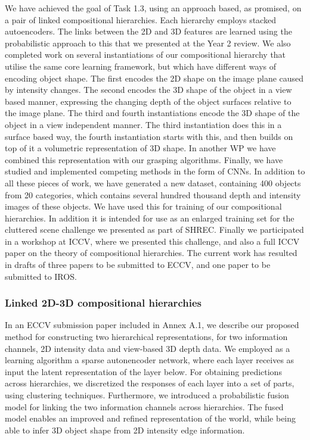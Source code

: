 \documentclass[a4paper,11pt,pdf]{../templates/pacmanreport}
\begin{document}
We have achieved the goal of Task 1.3, using an approach based, as promised, on a pair of linked compositional hierarchies. Each hierarchy employs stacked autoencoders. The links between the 2D and 3D features are learned using the probabilistic approach to this that we presented at the Year 2 review. We also completed work on several instantiations of our compositional hierarchy that utilise the same core learning framework, but which have different ways of encoding object shape. The first encodes the 2D shape on the image plane caused by intensity changes. The second encodes the 3D shape of the object in a view based manner, expressing the changing depth of the object surfaces relative to the image plane. The third and fourth instantiations encode the 3D shape of the object in a view independent manner. The third instantiation does this in a surface based way, the fourth instantiation starts with this, and then builds on top of it a volumetric representation of 3D shape. In another WP we have combined this representation with our grasping algorithms. Finally, we have studied and implemented competing methods in the form of CNNs. In addition to all these pieces of work, we have generated a new dataset, containing 400 objects from 20 categories, which contains several hundred thousand depth and intensity images of these objects. We have used this for training of our compositional hierarchies. In addition it is intended for use as an enlarged training set for the cluttered scene challenge we presented as part of SHREC. Finally we participated in a workshop at ICCV, where we presented this challenge, and also a full ICCV paper on the theory of compositional hierarchies. The current work has resulted in drafts of three papers to be submitted to ECCV, and one paper to be submitted to IROS.

\subsubsection{Linked 2D-3D compositional hierarchies}

In an ECCV submission paper included in Annex A.1, we describe our proposed method for constructing two hierarchical representations, for two information channels, 2D intensity data and view-based 3D depth data. We employed as a learning algorithm a sparse autonencoder network, where each layer receives as input the latent representation of the layer below. For obtaining predictions across hierarchies, we discretized the responses of each layer into a set of parts, using clustering techniques. Furthermore, we introduced a probabilistic fusion model for linking the two information channels across hierarchies. The fused model enables an improved and refined representation of the world, while being able to infer 3D object shape from 2D intensity edge information.
\end{document}
